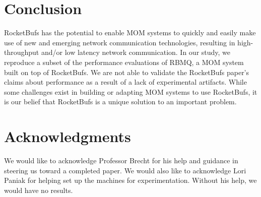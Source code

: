 \documentclass[letterpaper,twocolumn,10pt]{article}
\begin{document}
\section{Conclusion}
RocketBufs has the potential to enable MOM systems to quickly and easily make use of new and emerging network communication technologies, resulting in high-throughput and/or low latency network communication.
In our study, we reproduce a subset of the performance evaluations of RBMQ, a MOM system built on top of RocketBufs.
We are not able to validate the RocketBufs paper's claims about performance as a result of a lack of experimental artifacts.
While some challenges exist in building or adapting MOM systems to use RocketBufs, it is our belief that RocketBufs is a unique solution to an important problem.



\section{Acknowledgments}

We would like to acknowledge Professor Brecht for his help and guidance in steering us toward a completed paper.
We would also like to acknowledge Lori Paniak for helping set up the machines for experimentation. Without his help, we would have no results.

{\footnotesize  }
\end{document}
